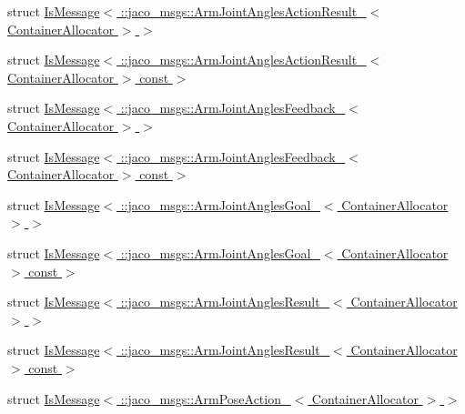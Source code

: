 \begin{DoxyCompactItemize}
\item 
struct \hyperlink{structros_1_1message__traits_1_1IsMessage_3_01_1_1jaco__msgs_1_1ArmJointAnglesActionResult___3_01ContainerAllocator_01_4_01_4}{Is\+Message$<$ \+::jaco\+\_\+msgs\+::\+Arm\+Joint\+Angles\+Action\+Result\+\_\+$<$ Container\+Allocator $>$ $>$}
\item 
struct \hyperlink{structros_1_1message__traits_1_1IsMessage_3_01_1_1jaco__msgs_1_1ArmJointAnglesActionResult___3_0ecc0e89c5dbaf8a28c0c9b85a14163aa}{Is\+Message$<$ \+::jaco\+\_\+msgs\+::\+Arm\+Joint\+Angles\+Action\+Result\+\_\+$<$ Container\+Allocator $>$ const  $>$}
\item 
struct \hyperlink{structros_1_1message__traits_1_1IsMessage_3_01_1_1jaco__msgs_1_1ArmJointAnglesFeedback___3_01ContainerAllocator_01_4_01_4}{Is\+Message$<$ \+::jaco\+\_\+msgs\+::\+Arm\+Joint\+Angles\+Feedback\+\_\+$<$ Container\+Allocator $>$ $>$}
\item 
struct \hyperlink{structros_1_1message__traits_1_1IsMessage_3_01_1_1jaco__msgs_1_1ArmJointAnglesFeedback___3_01Con0e7d69b5178c34db262ff82755872089}{Is\+Message$<$ \+::jaco\+\_\+msgs\+::\+Arm\+Joint\+Angles\+Feedback\+\_\+$<$ Container\+Allocator $>$ const  $>$}
\item 
struct \hyperlink{structros_1_1message__traits_1_1IsMessage_3_01_1_1jaco__msgs_1_1ArmJointAnglesGoal___3_01ContainerAllocator_01_4_01_4}{Is\+Message$<$ \+::jaco\+\_\+msgs\+::\+Arm\+Joint\+Angles\+Goal\+\_\+$<$ Container\+Allocator $>$ $>$}
\item 
struct \hyperlink{structros_1_1message__traits_1_1IsMessage_3_01_1_1jaco__msgs_1_1ArmJointAnglesGoal___3_01Containc1e2770d9c0822999f96da684a7da2a0}{Is\+Message$<$ \+::jaco\+\_\+msgs\+::\+Arm\+Joint\+Angles\+Goal\+\_\+$<$ Container\+Allocator $>$ const  $>$}
\item 
struct \hyperlink{structros_1_1message__traits_1_1IsMessage_3_01_1_1jaco__msgs_1_1ArmJointAnglesResult___3_01ContainerAllocator_01_4_01_4}{Is\+Message$<$ \+::jaco\+\_\+msgs\+::\+Arm\+Joint\+Angles\+Result\+\_\+$<$ Container\+Allocator $>$ $>$}
\item 
struct \hyperlink{structros_1_1message__traits_1_1IsMessage_3_01_1_1jaco__msgs_1_1ArmJointAnglesResult___3_01Contab320d4306643d8c35fa1900717aa7094}{Is\+Message$<$ \+::jaco\+\_\+msgs\+::\+Arm\+Joint\+Angles\+Result\+\_\+$<$ Container\+Allocator $>$ const  $>$}
\item 
struct \hyperlink{structros_1_1message__traits_1_1IsMessage_3_01_1_1jaco__msgs_1_1ArmPoseAction___3_01ContainerAllocator_01_4_01_4}{Is\+Message$<$ \+::jaco\+\_\+msgs\+::\+Arm\+Pose\+Action\+\_\+$<$ Container\+Allocator $>$ $>$}

\end{DoxyCompactItemize}
